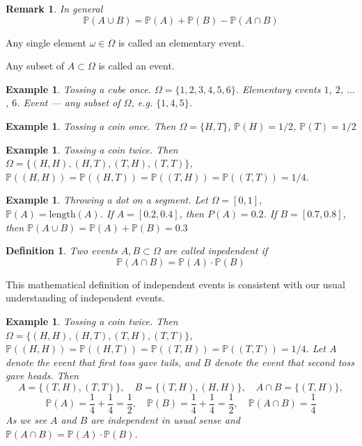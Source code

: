 \documentclass[12pt]{article}
\newtheorem{remark}[theorem]{Remark}
\newtheorem{definition}[theorem]{Definition}
\newtheorem{example}[theorem]{Example}
\begin{document}
\begin{remark} In general
    $$
        \mathbb{P}(A\cup B)=\mathbb{P}(A)+\mathbb{P}(B)-\mathbb{P}(A\cap B)
    $$
\end{remark}


Any single element $\omega\in\Omega$ is called an elementary event.

Any subset of $A\subset\Omega$ is called an event.

\begin{example} Tossing a cube once. $\Omega=\{1,2,3,4,5,6\}$. Elementary events
    $1$, $2$, $\ldots$, $6$. Event --- any subset of $\Omega$, e.g. $\{1,4,5\}$.
\end{example}

\begin{example} Tossing a coin once. Then  $\Omega=\{H, T\}$,
    $\mathbb{P}(H)=1/2$, $\mathbb{P}(T)=1/2$
\end{example}

\begin{example} Tossing a coin twice. Then
    $\Omega=\{(H,H), (H, T), (T, H), (T,T)\}$,
    $\mathbb{P}((H,H))=\mathbb{P}((H,T))
        =\mathbb{P}((T,H))
        =\mathbb{P}((T,T))=1/4$.
\end{example}

\begin{example} Throwing a dot on a segment. Let $\Omega=[0,1]$,
    $\mathbb{P}(A)=\mbox{length}(A)$. If $A=[0.2, 0.4]$, then $P(A)=0.2$. If
    $B=[0.7,0.8]$, then $\mathbb{P}(A\cup B)=\mathbb{P}(A)+\mathbb{P}(B)=0.3$
\end{example}

\begin{definition} Two events $A,B\subset \Omega$ are called inpedendent if
    $$
        \mathbb{P}(A\cap B)=\mathbb{P}(A)\cdot\mathbb{P}(B)
    $$
\end{definition}

This mathematical definition of independent events is consistent with our usual
understanding of independent events.

\begin{example} Tossing a coin twice. Then
    $\Omega=\{(H,H), (H, T), (T, H),(T,T)\}$,
    $\mathbb{P}((H,H))
        =\mathbb{P}((H,T))
        =\mathbb{P}((T,H))
        =\mathbb{P}((T,T))=1/4$.
    Let $A$ denote the event that first toss gave tails, and $B$ denote the
    event that second toss gave heads. Then
    $$
        A=\{(T,H),(T,T)\},\quad B=\{(T,H),(H,H)\},\quad A\cap B=\{(T,H)\},
    $$
    $$
        \mathbb{P}(A)=\frac{1}{4}+\frac{1}{4}=\frac{1}{2},\quad
        \mathbb{P}(B)=\frac{1}{4}+\frac{1}{4}=\frac{1}{2},\quad
        \mathbb{P}(A\cap B)=\frac{1}{4}
    $$
    As we see $A$ and $B$ are independent in usual sense and $\mathbb{P}(A\cap
        B)=\mathbb{P}(A)\cdot\mathbb{P}(B)$.
\end{example}
\end{document}
